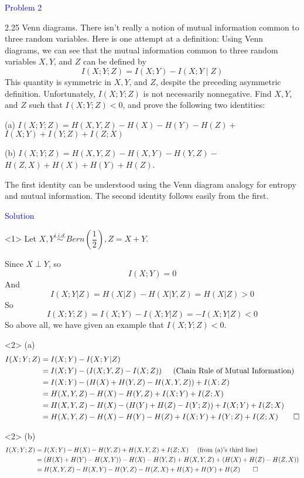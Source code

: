 \textcolor{blue}{Problem 2}

2.25 Venn diagrams. There isn't really a notion of mutual information common to three random variables. Here is one attempt at a definition: Using Venn diagrams, we can see that the mutual information common to three random variables $X, Y$, and $Z$ can be defined by
$$I(X ; Y ; Z)=I(X ; Y)-I(X ; Y \mid Z)$$
This quantity is symmetric in $X, Y$, and $Z$, despite the preceding asymmetric definition. Unfortunately, $I(X ; Y ; Z)$ is not necessarily nonnegative. Find $X, Y$, and $Z$ such that $I(X ; Y ; Z)<0$, and prove the following two identities:

(a) $I(X ; Y ; Z)=H(X, Y, Z)-H(X)-H(Y)-H(Z)+$ $I(X ; Y)+I(Y ; Z)+I(Z ; X)$

(b) $I(X ; Y ; Z)=H(X, Y, Z)-H(X, Y)-H(Y, Z)-$ $H(Z, X)+H(X)+H(Y)+H(Z)$.

The first identity can be understood using the Venn diagram analogy for entropy and mutual information. The second identity follows easily from the first.

\textcolor{blue}{Solution}

<1> Let $X,Y\stackrel{i.i.d.}{\sim}Bern\left(\dfrac{1}{2}\right), Z = X + Y$.

Since $X\perp Y$, so $$I(X;Y)=0$$
And
$$I(X;Y|Z)=H(X|Z)-H(X|Y,Z)=H(X|Z)>0$$
So
$$I(X;Y;Z)=I(X;Y)-I(X;Y|Z)=-I(X;Y|Z)<0$$
So above all, we have given an example that $I(X;Y;Z)<0$.

<2> (a)
\begin{align*}
I(X;Y;Z) &= I(X;Y) - I(X;Y|Z) \\
&= I(X;Y) - \left(I(X;Y,Z) - I(X;Z)\right) \text{\ \ \ \ (Chain Rule of Mutual Information)} \\
&= I(X;Y) - \left(H(X) + H(Y,Z) - H(X,Y,Z)\right) + I(X;Z) \\
&= H(X,Y,Z) - H(X) - H(Y,Z) + I(X;Y) + I(Z;X) \\
&= H(X,Y,Z) - H(X) - \left(H(Y) + H(Z) - I(Y;Z)\right) + I(X;Y) + I(Z;X) \\
&= H(X,Y,Z) - H(X) - H(Y) - H(Z) + I(X;Y) + I(Y;Z) + I(Z;X) \qed
\end{align*}

<2> (b)
\begin{align*}
I(X;Y;Z) &= I(X;Y) - H(X) - H(Y,Z) + H(X,Y,Z) + I(Z;X) \text{\ \ \ \ (from (a)'s third line)} \\
&= \left(H(X)+H(Y)-H(X,Y)\right) - H(X) - H(Y, Z) + H(X,Y,Z) + \left(H(X)+H(Z)-H(Z,X)\right) \\
&= H(X,Y,Z) - H(X,Y) - H(Y,Z) - H(Z,X) + H(X) + H(Y) + H(Z) \qed
\end{align*}

\newpage